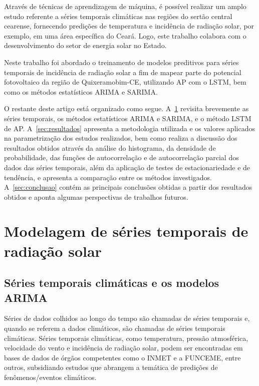 \documentclass[a4paper]{ifacconf}
\begin{document}
Através de técnicas de aprendizagem de máquina, é possível realizar um amplo estudo referente a séries temporais climáticas nas regiões do sertão central cearense, fornecendo predições de temperatura e incidência de radiação solar, por exemplo, em uma área específica do Ceará. Logo, este trabalho colabora com o desenvolvimento do setor de energia solar no Estado.

Neste trabalho foi abordado o treinamento de modelos preditivos para séries temporais de incidência de radiação solar a fim de mapear parte do potencial fotovoltaico da região de Quixeramobim-CE, utilizando \ac{AP} com o \ac{LSTM}, bem como os métodos estatísticos \ac{ARIMA} e \ac{SARIMA}.

O restante deste artigo está organizado como segue. A~\ref{sec:modelagem-series-rad} revisita brevemente as séries temporais, os métodos estatísticos \ac{ARIMA} e \ac{SARIMA}, e o método \ac{LSTM} de \ac{AP}. A~\ref{sec:resultados} apresenta a metodologia utilizada e os valores aplicados na parametrização dos estudos realizados, bem como realiza a discussão dos resultados obtidos através da análise do histograma, da densidade de probabilidade, das funções de autocorrelação e de autocorrelação parcial dos dados das séries temporais, além da aplicação de testes de estacionariedade e de tendência, e apresenta a comparação entre os métodos investigados. A~\ref{sec:conclusao} contém as principais conclusões obtidas a partir dos resultados obtidos e aponta algumas perspectivas de trabalhos futuros.

\section{Modelagem de séries temporais de radiação solar}\label{sec:modelagem-series-rad}

\subsection{Séries temporais climáticas e os modelos \acs{ARIMA}}\label{subsec:serie-temp-climaticas}
Séries de dados colhidos ao longo do tempo são chamadas de séries temporais e, quando se referem a dados climáticos, são chamadas de séries temporais climáticas. Séries temporais climáticas, como temperatura, pressão atmosférica, velocidade do vento e incidência de radiação solar, podem ser encontradas em bases de dados de órgãos competentes como o \ac{INMET} e a \ac{FUNCEME}, entre outros, subsidiando estudos que abrangem a temática de predições de fenômenos/eventos climáticos.
\end{document}
